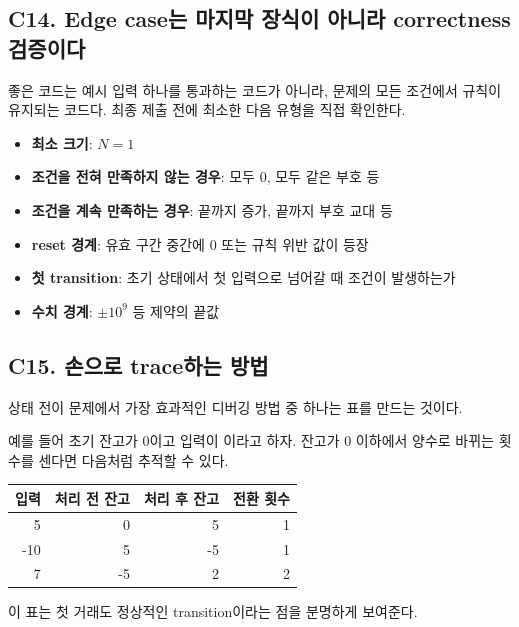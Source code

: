\subsection{C14. Edge case는 마지막 장식이 아니라 correctness 검증이다}
좋은 코드는 예시 입력 하나를 통과하는 코드가 아니라, 문제의 모든 조건에서 규칙이 유지되는 코드다. 최종 제출 전에 최소한 다음 유형을 직접 확인한다.

\begin{itemize}
  \item \textbf{최소 크기}: $N=1$
  \item \textbf{조건을 전혀 만족하지 않는 경우}: 모두 0, 모두 같은 부호 등
  \item \textbf{조건을 계속 만족하는 경우}: 끝까지 증가, 끝까지 부호 교대 등
  \item \textbf{reset 경계}: 유효 구간 중간에 0 또는 규칙 위반 값이 등장
  \item \textbf{첫 transition}: 초기 상태에서 첫 입력으로 넘어갈 때 조건이 발생하는가
  \item \textbf{수치 경계}: $\pm 10^9$ 등 제약의 끝값
\end{itemize}

\subsection{C15. 손으로 trace하는 방법}
상태 전이 문제에서 가장 효과적인 디버깅 방법 중 하나는 표를 만드는 것이다.

예를 들어 초기 잔고가 0이고 입력이 이라고 하자. 잔고가 0 이하에서 양수로 바뀌는 횟수를 센다면 다음처럼 추적할 수 있다.

\begin{center}
\begin{tabular}{rrrr}
\toprule
입력 & 처리 전 잔고 & 처리 후 잔고 & 전환 횟수 \\
\midrule
5 & 0 & 5 & 1 \\
-10 & 5 & -5 & 1 \\
7 & -5 & 2 & 2 \\
\bottomrule
\end{tabular}
\end{center}

이 표는 첫 거래도 정상적인 transition이라는 점을 분명하게 보여준다.

